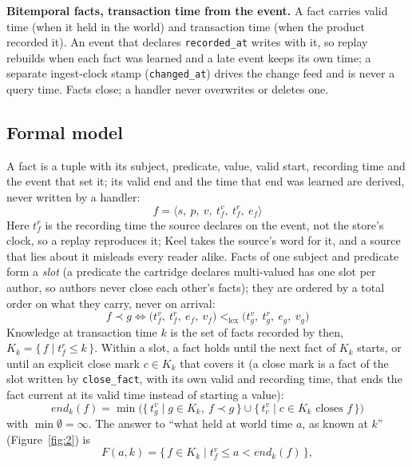 \documentclass[sigconf, nonacm]{acmart}
\newcommand{\code}[1]{\texttt{#1}}
\begin{document}
\textbf{Bitemporal facts, transaction time from the event.} A fact carries valid time (when it held in the world) and transaction time (when the product recorded it). An event that declares \code{recorded\_at} writes with it, so replay rebuilds when each fact was learned and a late event keeps its own time; a separate ingest-clock stamp (\code{changed\_at}) drives the change feed and is never a query time. Facts close; a handler never overwrites or deletes one.

\subsection{Formal model}
\label{sec:formal}

A fact is a tuple with its subject, predicate, value, valid start, recording time and the event that set it; its valid end and the time that end was learned are derived, never written by a handler:
\begin{equation*}
f = \langle s,\ p,\ v,\ t^{v}_f,\ t^{r}_f,\ e_f \rangle
\end{equation*}
Here $t^{r}_f$ is the recording time the source declares on the event, not the store's clock, so a replay reproduces it; Keel takes the source's word for it, and a source that lies about it misleads every reader alike. Facts of one subject and predicate form a \emph{slot} (a predicate the cartridge declares multi-valued has one slot per author, so authors never close each other's facts); they are ordered by a total order on what they carry, never on arrival:
\begin{equation*}
f \prec g \iff \big(t^{v}_f,\ t^{r}_f,\ e_f,\ v_f\big) <_{\mathrm{lex}} \big(t^{v}_g,\ t^{r}_g,\ e_g,\ v_g\big)
\end{equation*}
Knowledge at transaction time $k$ is the set of facts recorded by then, $K_k = \{\, f \mid t^{r}_f \le k \,\}$. Within a slot, a fact holds until the next fact of $K_k$ starts, or until an explicit close mark $c \in K_k$ that covers it (a close mark is a fact of the slot written by \code{close\_fact}, with its own valid and recording time, that ends the fact current at its valid time instead of starting a value):
\begin{equation*}
\mathit{end}_k(f) = \min\big(\{\, t^{v}_g \mid g \in K_k,\ f \prec g \,\} \cup \{\, t^{v}_c \mid c \in K_k \text{ closes } f \,\}\big)
\end{equation*}
with $\min \emptyset = \infty$. The answer to ``what held at world time $a$, as known at $k$'' (Figure~\ref{fig:2}) is
\begin{equation*}
F(a, k) = \{\, f \in K_k \mid t^{v}_f \le a < \mathit{end}_k(f) \,\},
\end{equation*}
\end{document}
